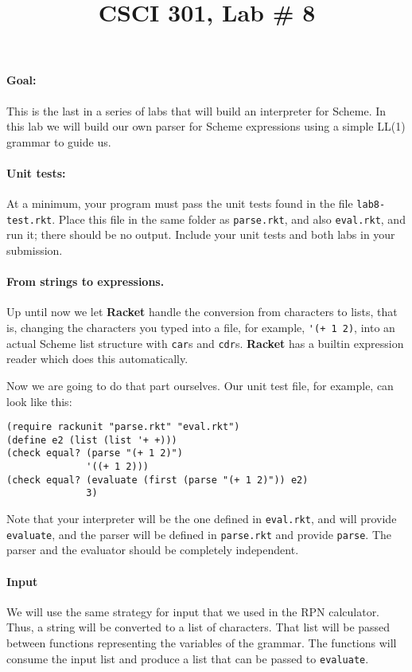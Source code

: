 \documentclass[letterpaper,12pt]{article}
\title{CSCI 301, Lab \# 8}
\author{\term}
\date{}
\begin{document}
\maketitle

\paragraph{Goal:} This is the last in a series of labs that will
build an interpreter for Scheme.  In this lab we will build our own
parser for Scheme expressions using a simple LL(1) grammar to guide
us. 

\paragraph{Unit tests:}
At a minimum, your program must pass the unit tests found in the file
\texttt{lab8-test.rkt}.  Place this file in the same folder as
\texttt{parse.rkt}, and also \texttt{eval.rkt}, and run it; there should be no
output.  Include your unit tests and both labs in your submission.

\paragraph{From strings to expressions.}

Up until now we let {\bf Racket} handle the conversion from characters to lists,
that is, changing the characters you typed into a file, for example,
\verb|'(+ 1 2)|, into an actual Scheme list structure with \texttt{car}s and
\texttt{cdr}s.  \textbf{Racket} has a builtin expression reader which does this
automatically.

Now we are going to do that part ourselves.  Our unit test file, for example,
can look like this:
\begin{Verbatim}[frame=single]
(require rackunit "parse.rkt" "eval.rkt")
(define e2 (list (list '+ +)))
(check equal? (parse "(+ 1 2)") 
              '((+ 1 2)))
(check equal? (evaluate (first (parse "(+ 1 2)")) e2)
              3)
\end{Verbatim}
Note that your interpreter will be the one defined in \texttt{eval.rkt}, and
will provide \texttt{evaluate}, and the parser will be defined in
\texttt{parse.rkt} and provide \texttt{parse}.  The parser and the evaluator
should be completely independent.


\paragraph{Input}
We will use the same strategy for input that we used in the RPN calculator.
Thus, a string will be converted to a list of characters.  That list will be
passed between functions representing the variables of the grammar.  The
functions will consume the input list and produce a list that can be passed to
\texttt{evaluate}.  
\end{document}
